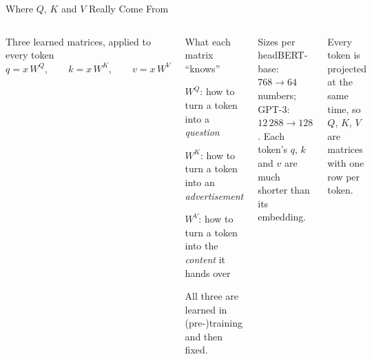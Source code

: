 \documentclass[aspectratio=169,10pt]{beamer}
\begin{document}
\begin{frame}{Where $Q$, $K$ and $V$ Really Come From}
\begin{columns}[T]
\begin{fbx}{Three learned matrices, applied to every token}
$q=x\,W^{Q},\qquad k=x\,W^{K},\qquad v=x\,W^{V}$
\end{fbx}
\begin{cbox}{What each matrix ``knows''}\scriptsize
\begin{tl}
\item $W^Q$: how to turn a token into a \emph{question}
\item $W^K$: how to turn a token into an \emph{advertisement}
\item $W^V$: how to turn a token into the \emph{content} it hands over
\end{tl}
All three are learned in (pre-)training and then fixed.
\end{cbox}
\begin{cbox}[ISSAnavy]{Sizes per head}\scriptsize BERT-base: $768\to64$ numbers; GPT-3: $12\,288\to128$. Each token's $q$, $k$ and $v$ are much shorter than its embedding.\end{cbox}
\begin{ibox}\scriptsize Every token is projected at the same time, so $Q$, $K$, $V$ are matrices with one row per token.\end{ibox}
\end{columns}
\end{frame}
\end{document}
